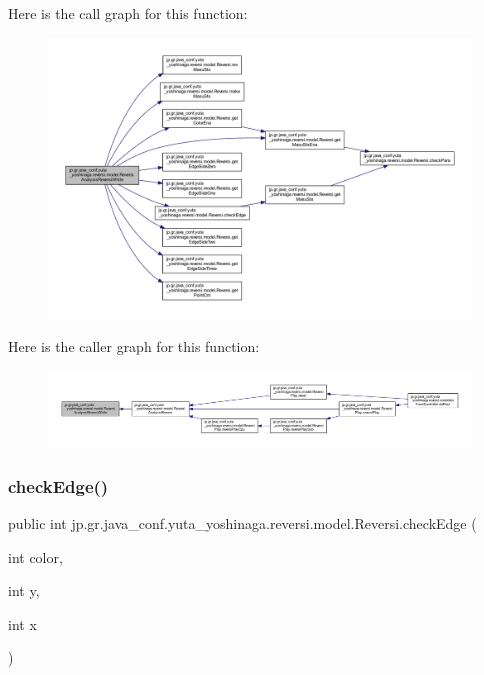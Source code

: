 Here is the call graph for this function\+:
\nopagebreak
\begin{figure}[H]
\begin{center}
\leavevmode
\includegraphics[width=350pt]{classjp_1_1gr_1_1java__conf_1_1yuta__yoshinaga_1_1reversi_1_1model_1_1_reversi_a519adbc5ec3bf5433fdb79bf8049cc75_cgraph}
\end{center}
\end{figure}
Here is the caller graph for this function\+:
\nopagebreak
\begin{figure}[H]
\begin{center}
\leavevmode
\includegraphics[width=350pt]{classjp_1_1gr_1_1java__conf_1_1yuta__yoshinaga_1_1reversi_1_1model_1_1_reversi_a519adbc5ec3bf5433fdb79bf8049cc75_icgraph}
\end{center}
\end{figure}
\mbox{\label{classjp_1_1gr_1_1java__conf_1_1yuta__yoshinaga_1_1reversi_1_1model_1_1_reversi_a4874c6523adfdfd42dfbd625f5e3fe7a}} 
\subsubsection{\texorpdfstring{check\+Edge()}{checkEdge()}}
{\footnotesize\ttfamily public int jp.\+gr.\+java\+\_\+conf.\+yuta\+\_\+yoshinaga.\+reversi.\+model.\+Reversi.\+check\+Edge (\begin{DoxyParamCaption}\item[{int}]{color,  }\item[{int}]{y,  }\item[{int}]{x }\end{DoxyParamCaption})}



